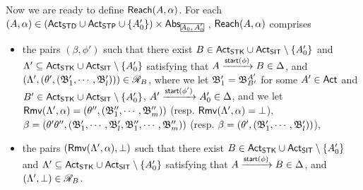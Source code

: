 {Now we are ready to define ${\sf Reach}(A,\alpha)$. For each $(A,\alpha) \in (\act_{\STD}\cup\act_{\STP}\cup\{A_0'\})\times\abs_{\mhcancel{A_0,A_0'}}$, ${\sf Reach}(A,\alpha)$ comprises
 \begin{itemize}
     \item the pairs $(\beta, \phi')$ such that there exist $B\in{\sf Act}_{\mathsf{STK}}\cup{\sf Act}_{\mathsf{SIT}}\setminus\{A_0'\}$ and $\Lambda'\subseteq{\sf Act}_{\mathsf{STK}}\cup{\sf Act}_{\mathsf{SIT}}\setminus\{A_0'\}$ satisfying that $A\xrightarrow{{\mathsf{start} }(\phi)}B\in\Delta$, and $(\Lambda',(\theta',({\mathfrak{B} }_1',\cdots,{\mathfrak{B} }_l')))\in\mathscr{R}_{B}$, where
     we let ${\mathfrak{B} }_1' = {\mathfrak{B} }_{B'}^{A'}$ for some $A'\in{\sf Act}$ and $B'\in{\sf Act}_{\mathsf{STK}}\cup{\sf Act}_{\mathsf{SIT}}\setminus\{A_0'\}$, $A'\xrightarrow{{\mathsf{start} }(\phi')}A_0'\in\Delta$, and we let $\mathsf{Rmv}(\Lambda',\alpha) = (\theta'',({\mathfrak{B} }_1'',\cdots,{\mathfrak{B} }_m''))$ (resp. $\mathsf{Rmv}(\Lambda',\alpha) = \bot$), $\beta = (\theta'\theta'',({\mathfrak{B} }_1',\cdots,{\mathfrak{B} }_l',{\mathfrak{B} }_1'',\cdots,{\mathfrak{B} }_m''))$ (resp. $\beta = (\theta',({\mathfrak{B} }_1',\cdots,{\mathfrak{B} }_l'))$),
%
    \item the pairs $(\mathsf{Rmv}(\Lambda',\alpha), \bot)$ such that there exist $B\in{\sf Act}_{\mathsf{STK}}\cup{\sf Act}_{\mathsf{SIT}}\setminus\{A_0'\}$ and $\Lambda'\subseteq{\sf Act}_{\mathsf{STK}}\cup{\sf Act}_{\mathsf{SIT}}\setminus\{A_0'\}$ satisfying that $A\xrightarrow{{\mathsf{start} }(\phi)}B\in\Delta$, and $(\Lambda',\bot)\in\mathscr{R}_{B}$.
     
 \end{itemize}

}
